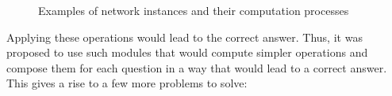 \documentclass[a4paper,twocolumn]{article}
\begin{document}
\begin{figure}
    \centering
    \caption{Examples of network instances and their computation processes}
\end{figure}
Applying these operations would lead to the correct answer. Thus, it was proposed to use such modules that would compute simpler operations and compose them for each question in a way that would lead to a correct answer. This gives a rise to a few more problems to solve:
\end{document}
